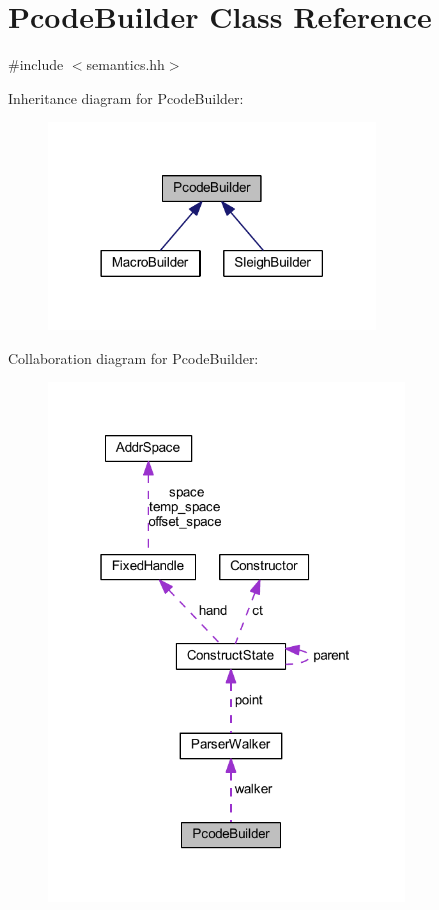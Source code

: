 \hypertarget{class_pcode_builder}{}\section{Pcode\+Builder Class Reference}
\label{class_pcode_builder}


{\ttfamily \#include $<$semantics.\+hh$>$}



Inheritance diagram for Pcode\+Builder\+:
\nopagebreak
\begin{figure}[H]
\begin{center}
\leavevmode
\includegraphics[width=246pt]{class_pcode_builder__inherit__graph}
\end{center}
\end{figure}


Collaboration diagram for Pcode\+Builder\+:
\nopagebreak
\begin{figure}[H]
\begin{center}
\leavevmode
\includegraphics[width=268pt]{class_pcode_builder__coll__graph}
\end{center}
\end{figure}
